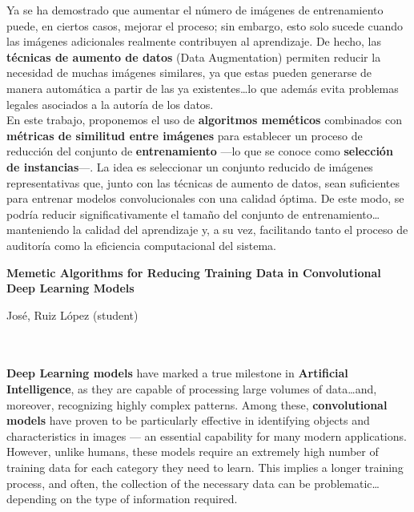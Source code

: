 Ya se ha demostrado que aumentar el número de imágenes de entrenamiento puede, en ciertos casos, mejorar el proceso;
sin embargo, esto solo sucede cuando las imágenes adicionales realmente contribuyen al aprendizaje.
De hecho, las \textbf{técnicas de aumento de datos} (Data Augmentation) permiten reducir la necesidad de muchas
imágenes similares, ya que estas pueden generarse de manera automática a partir de las ya existentes\ldots lo que además
evita problemas legales asociados a la autoría de los datos. \\[6pt]

En este trabajo, proponemos el uso de \textbf{algoritmos meméticos} combinados con
\textbf{métricas de similitud entre imágenes} para establecer un proceso de reducción del conjunto de
\textbf{entrenamiento} —lo que se conoce como \textbf{selección de instancias}—.
La idea es seleccionar un conjunto reducido de imágenes representativas que, junto con las técnicas de aumento de
datos, sean suficientes para entrenar modelos convolucionales con una calidad óptima.
De este modo, se podría reducir significativamente el tamaño del conjunto de entrenamiento\ldots manteniendo la calidad
del aprendizaje y, a su vez, facilitando tanto el proceso de auditoría como la eficiencia computacional del sistema.
\\[6pt]


\cleardoublepage


\thispagestyle{empty}


\begin{center}
{\large\bfseries Memetic Algorithms for Reducing Training Data in Convolutional Deep Learning Models}\\
\end{center}
\begin{center}
José, Ruiz López (student)\\
\end{center}

\\

\vspace{0.7cm}
\\

\textbf{Deep Learning models} have marked a true milestone in \textbf{Artificial Intelligence}, as they are capable of
processing large volumes of data\ldots and, moreover, recognizing highly complex patterns.
Among these, \textbf{convolutional models} have proven to be particularly effective in identifying objects and
characteristics in images — an essential capability for many modern applications.
However, unlike humans, these models require an extremely high number of training data for each category they need to
learn.
This implies a longer training process, and often, the collection of the necessary data can be problematic\ldots
depending on the type of information required. \\[6pt]

